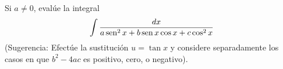 \item Si $a \ne 0$, evalúe la integral
    \[ \int \frac{dx}{a\operatorname{sen}^2 x + b\operatorname{sen} x \cos x + c\cos^2 x} \]
    (Sugerencia: Efectúe la sustitución $u = \tan x$ y considere separadamente los casos en que $b^2 - 4ac$ es positivo, cero, o negativo).
